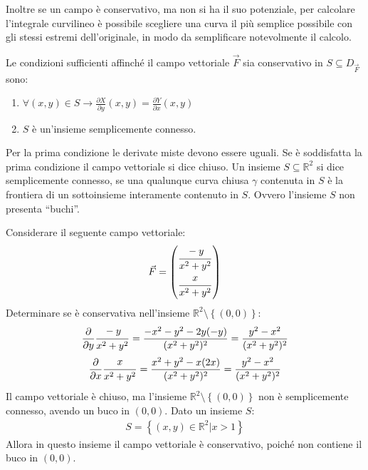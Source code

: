 \documentclass{article}
\numberwithin{equation}{subsection}
\begin{document}
Inoltre se un campo è conservativo, ma non si ha il suo potenziale, per calcolare l'integrale curvilineo è possibile scegliere una curva il più semplice possibile con gli stessi estremi dell'originale, in modo da semplificare notevolmente il calcolo. 


Le condizioni sufficienti affinché il campo vettoriale $\vec{F}$ sia conservativo in $S\subseteq D_{\vec{F}}$ sono:
\begin{enumerate}
    \item $\forall(x,y)\in S\to\displaystyle\frac{\partial X}{\partial y}(x,y)=\frac{\partial Y}{\partial x}(x,y)$
    \item $S$ è un'insieme semplicemente connesso. 
\end{enumerate}
Per la prima condizione le derivate miste devono essere uguali. Se è soddisfatta la prima condizione il campo vettoriale si dice chiuso. 
Un insieme $S\subseteq\mathbb{R}^2$ si dice semplicemente connesso, se una qualunque curva chiusa $\gamma$ contenuta in $S$ è la frontiera di un sottoinsieme interamente contenuto in $S$. Ovvero l'insieme $S$ non presenta ``buchi''. 






Considerare il seguente campo vettoriale:
\begin{gather*}
    \vec{F}=\begin{pmatrix}
        \displaystyle\frac{\strut-y}{\strut x^2+y^2}\\ \displaystyle\frac{\strut x}{\strut x^2+y^2}
    \end{pmatrix}
\end{gather*}
Determinare se è conservativa nell'insieme $\mathbb{R}^2\setminus\left\{(0,0)\right\}$:
\begin{gather*}
    \frac{\partial}{\partial y}\frac{\strut-y}{\strut x^2+y^2}=\frac{-x^2-y^2-2y(-y)}{(x^2+y^2)^2}=\frac{y^2-x^2}{(x^2+y^2)^2}\\
    \frac{\partial}{\partial x}\frac{\strut x}{\strut x^2+y^2}=\frac{x^2+y^2-x(2x)}{(x^2+y^2)^2}=\frac{y^2-x^2}{(x^2+y^2)^2}
\end{gather*}
Il campo vettoriale è chiuso, ma l'insieme $\mathbb{R}^2\setminus\left\{(0,0)\right\}$ non è semplicemente connesso, avendo un buco in $(0,0)$. 
Dato un insieme $S$:
\begin{gather*}
    S=\left\{(x,y)\in\mathbb{R}^2\big|x>1\right\}
\end{gather*}
Allora in questo insieme il campo vettoriale è conservativo, poiché non contiene il buco in $(0,0)$. 
\end{document}
